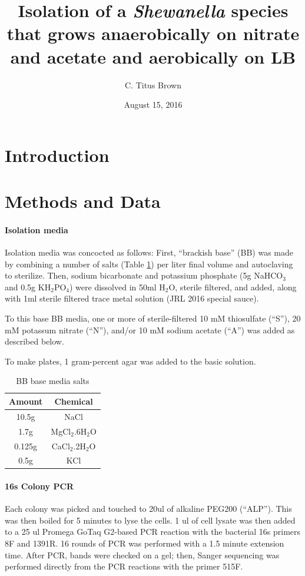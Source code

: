 \documentclass{article}
\begin{document}
\title{Isolation of a {\em Shewanella} species that grows
  anaerobically on nitrate and acetate and aerobically on LB}
\author{C. Titus Brown}
\date{August 15, 2016}

\maketitle

\section*{Introduction}

\section*{Methods and Data}

\paragraph{Isolation media} Isolation media was concocted as follows:
First, ``brackish base'' (BB) was made by combining a number of salts
(Table \ref{tab:media}) per liter final volume and autoclaving to
sterilize.  Then, sodium bicarbonate and potassium phosphate (5g
NaHCO$_3$ and 0.5g KH$_2$PO$_4$) were dissolved in 50ml H$_2$O,
sterile filtered, and added, along with 1ml sterile filtered trace
metal solution (JRL 2016 special sauce).

To this base BB media, one or more of sterile-filtered 10 mM
thiosulfate (``S''), 20 mM potassum nitrate (``N''), and/or 10 mM
sodium acetate (``A'') was added as described below.

To make plates, 1 gram-percent agar was added to the basic solution.

\begin{table}
\centering
\begin{tabular}{|c|c|}
\hline
Amount & Chemical \\
\hline
10.5g & NaCl \\
1.7g & MgCl$_2$.6H$_2$O \\
0.125g & CaCl$_2$.2H$_2$O \\
0.5g & KCl \\
\hline
\end{tabular}
\label{tab:media}
\caption{BB base media salts}
\end{table}

\paragraph{16s Colony PCR} Each colony was picked and touched to 20ul of
alkaline PEG200 (``ALP'').  This was then boiled for 5 minutes to lyse
the cells. 1 ul of cell lysate was then added to a 25 ul Promega GoTaq
G2-based PCR reaction with the bacterial 16s primers 8F and 1391R.  16
rounds of PCR was performed with a 1.5 minute extension time.  After
PCR, bands were checked on a gel; then,
Sanger sequencing was performed directly from the PCR reactions with
the primer 515F.
\end{document}
